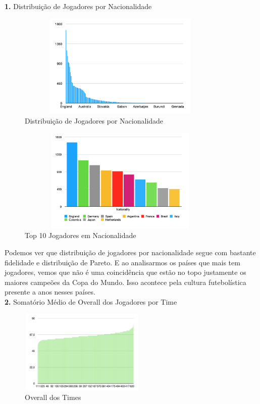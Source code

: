 \documentclass{article}
\begin{document}
\textbf{1.} Distribuição de Jogadores por Nacionalidade
\begin{figure}[H]
    \centering
    \includegraphics[width=10cm,height=5cm]{Distribuição de Jogadores por Nacionalidade.png}
    \caption{Distribuição de Jogadores por Nacionalidade}
    \label{fig:my_label}
\end{figure}
\begin{figure}[H]
    \centering
    \includegraphics[width=10cm,height=5cm]{Top 10 Jogadores em Nacionalidade.png}
    \caption{Top 10 Jogadores em Nacionalidade}
    \label{fig:my_label}
\end{figure}

Podemos ver que distribuição de jogadores por nacionalidade segue com bastante fidelidade e distribuição de Pareto. E ao analisarmos os países que mais tem jogadores, vemos que não é uma coincidência que estão no topo justamente os maiores campeões da Copa do Mundo. Isso acontece pela cultura futebolística presente a anos nesses países.\\

\newpage
\textbf{2.} Somatório Médio de Overall dos Jogadores por Time

\begin{figure}[H]
    \centering
    \includegraphics[width=6cm,height=4cm]{Overall dos Times.png}
    \caption{Overall dos Times}
    \label{fig:my_label}
\end{figure}
\end{document}
